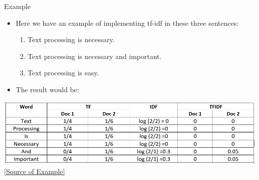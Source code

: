 \begin{frame}[fragile]{Example}

    \begin{itemize}
        \item Here we have an example of implementing tf-idf in these three sentences:
              \begin{enumerate}
                  \item Text processing is necessary.
                  \item Text processing is necessary and important.
                  \item Text processing is easy.
              \end{enumerate}
        \item The result would be:
    \end{itemize}
    \begin{center}
        \includegraphics[scale=0.6]{../images/img_6.png} \\
        \href{https://www.analyticsvidhya.com/blog/2021/07/bag-of-words-vs-tfidf-vectorization-a-hands-on-tutorial/}{[Source of Example]}
    \end{center}

\end{frame}